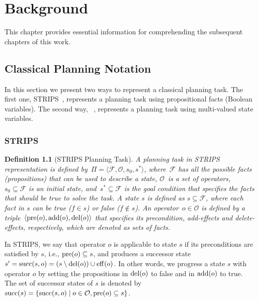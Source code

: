 \documentclass[ppgc,diss,english]{iiufrgs}
\newtheorem{definition}{Definition}
\begin{document}
\chapter{Background}
\label{cha:background}
This chapter provides essential information for comprehending the subsequent chapters of this work.


\section{Classical Planning Notation}
\label{sec:background-planning-notation}
In this section we present two ways to represent a classical planning task. The first one, STRIPS~\cite{Fikes.Nilsson/1971}, represents a planning task using propositional facts (Boolean variables). The second way, \sas~\cite{Backstrom.Nebel/1995}, represents a planning task using multi-valued state variables. %

\subsection{STRIPS}
\label{sec:background-strips}

\begin{definition}[STRIPS Planning Task]\label{def:strips}
A planning task in STRIPS representation is defined by~$\Pi=\langle\mathcal{F},\mathcal{O},s_{0},s^{*}\rangle$, where~$\mathcal{F}$ has all the possible facts (propositions) that can be used to describe a state, $\mathcal{O}$~is a set of operators,~$s_{0} \subseteq \mathcal{F}$ is an initial state, and~$s^{*} \subseteq \mathcal{F}$ is the goal condition that specifies the facts that should be true to solve the task.
A state $s$ is defined as $s \subseteq \mathcal{F}$, where each fact in $s$ can be true ($f \in s$) or false ($f \notin s$). %
An operator~$o \in \mathcal{O}$ is defined by a triple~$\langle\operatorname{pre}(o),\operatorname{add}(o),\operatorname{del}(o)\rangle$ that specifies its precondition, add-effects and delete-effects, respectively, which are denoted as sets of facts.
\end{definition}

In STRIPS, we say that operator $o$ is applicable to state $s$ if its preconditions are satisfied by $s$, i.e., $\operatorname{pre}(o) \subseteq s$, and produces a successor state~$s' = \operatorname{succ}(s,o) = (s \setminus \operatorname{del}(o)) \cup \operatorname{eff}(o)$. In other words, we progress a state $s$ with operator $o$ by setting the propositions in $\operatorname{del}(o)$ to false and in $\operatorname{add}(o)$ to true. The set of successor states of $s$ is denoted by~$\operatorname{succ}(s)=\{\operatorname{succ}(s,o)\mid o\in \mathcal{O}, \operatorname{pre}(o) \subseteq s\}$.
\end{document}
